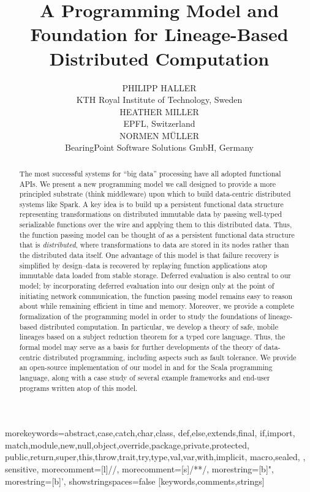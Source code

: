 \documentclass{jfp1}
\title[Journal of Functional Programming]{A Programming Model and Foundation for Lineage-Based Distributed Computation}
\author[P. Haller, H. Miller, and N. M{\"u}ller]{%
  PHILIPP HALLER\\ KTH Royal Institute of Technology, Sweden\\[1ex]%
  HEATHER MILLER\\ EPFL, Switzerland\\[1ex]%
  NORMEN M{\"U}LLER\\ BearingPoint Software Solutions GmbH, Germany}%
\begin{document}
\setmainfont[
  Ligatures=TeX,
  SmallCapsFont={TeX Gyre Termes},
  SmallCapsFeatures={Letters=SmallCaps},
]{Times New Roman}

%
{morekeywords={abstract,case,catch,char,class,%
    def,else,extends,final,%
    if,import,%
    match,module,new,null,object,override,package,private,protected,%
    public,return,super,this,throw,trait,try,type,val,var,with,implicit,%
    macro,sealed,%
  },%
  sensitive,%
  morecomment=[l]//,%
  morecomment=[s]{/*}{*/},%
  morestring=[b]",%
  morestring=[b]',%
  showstringspaces=false%
}[keywords,comments,strings]%

\setmonofont[Scale=0.8,BoldFont={Consolas Bold}]{Consolas}

\label{firstpage}

\maketitle

\begin{abstract}
  The most successful systems for ``big data'' processing have all
  adopted functional APIs. We present a new programming model we call
  {\FP} designed to provide a more principled substrate (think middleware) upon
  which to build data-centric distributed systems like Spark. A key idea is to build up a
  persistent functional data structure representing transformations on
  distributed immutable data by passing well-typed serializable
  functions over the wire and applying them to this distributed
  data. Thus, the function passing model can be thought of as a
  persistent functional data structure that is {\em distributed},
  where transformations to data are stored in its nodes rather than
  the distributed data itself. One advantage of this model is that failure recovery
  is simplified by design--data is recovered by replaying function applications atop
  immutable data loaded from stable storage. Deferred evaluation is
  also central to our model; by incorporating deferred evaluation into
  our design only at the point of initiating network communication,
  the function passing model remains easy to reason about while
  remaining efficient in time and memory. Moreover, we provide a
  complete formalization of the programming model in order to study
  the foundations of lineage-based distributed computation. In
  particular, we develop a theory of safe, mobile lineages based on a
  subject reduction theorem for a typed core language. Thus, the
  formal model may serve as a basis for further developments of the
  theory of data-centric distributed programming, including aspects
  such as fault tolerance. We provide an open-source implementation of
  our model in and for the Scala programming language, along with a
  case study of several example frameworks and end-user programs
  written atop of this model.
\end{abstract}
\end{document}
